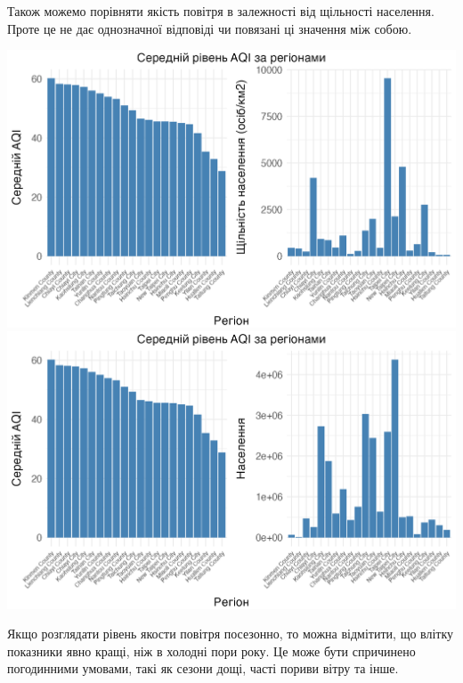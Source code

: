 \documentclass{article}
\begin{document}
\begin{enumerate}
    Також можемо порівняти якість повітря в залежності від щільності населення. Проте це не дає однозначної відповіді чи повязані ці значення між собою.
    \begin{center}
    \includegraphics[width=6in]{plots/question4/avg_aqi_by_county_w_dens.png}
    \includegraphics[width=6in]{plots/question4/avg_aqi_by_county_w_pop.png}
    \end{center}

    Якщо розглядати рівень якости повітря посезонно, то можна відмітити, що влітку показники явно кращі, ніж в холодні пори року. Це може бути спричинено погодинними умовами, такі як сезони дощі, часті пориви вітру та інше.
    

\end{enumerate}
\end{document}

